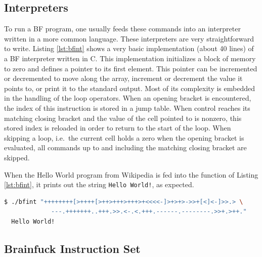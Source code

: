 \subsection{Interpreters}
To run a BF program, one usually feeds these commands into an interpreter written in a more common language. These interpreters are very straightforward to write. Listing \ref{lst:bfint} shows a very basic implementation (about 40 lines) of a BF interpreter written in C. This implementation initializes a block of memory to zero and defines a pointer to its first element. This pointer can be incremented or decremented to move along the array, increment or decrement the value it points to, or print it to the standard output. Most of its complexity is embedded in the handling of the loop operators. When an opening bracket is encountered, the index of this instruction is stored in a jump table. When control reaches its matching closing bracket and the value of the cell pointed to is nonzero, this stored index is reloaded in order to return to the start of the loop. When skipping a loop, i.e.~the current cell holds a zero when the opening bracket is evaluated, all commands up to and including the matching closing bracket are skipped.

\begin{lstfloat}[H]
    
\caption{Very basic implementation of a BF interpreter in C.}
\label{lst:bfint}
\end{lstfloat}

When the Hello World program from Wikipedia \cite{bfwiki} is fed into the function of Listing \ref{lst:bfint}, it prints out the string \texttt{Hello World!}, as expected.
\vspace{0.5cm}
\begin{lstlisting}[language=bash]
  $ ./bfint "++++++++[>++++[>++>+++>+++>+<<<<-]>+>+>->>+[<]<-]>>.> \
             ---.+++++++..+++.>>.<-.<.+++.------.--------.>>+.>++."
  Hello World!
\end{lstlisting}


\subsection{Brainfuck Instruction Set}
